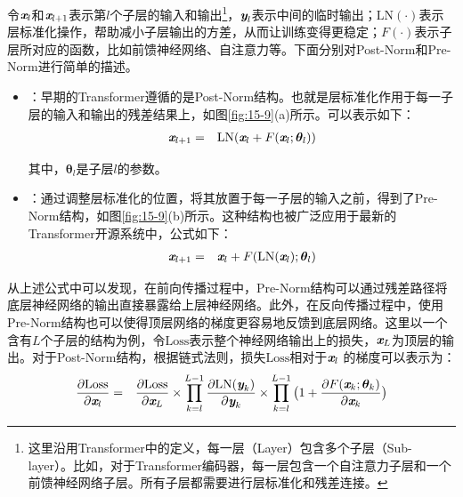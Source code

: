 \parinterval 令$\textbf{\em x}_l$和$\textbf{\em x}_{l+1}$表示第$l$个子层的输入和输出\footnote[4]{这里沿用Transformer中的定义，每一层（Layer）包含多个子层（Sub-layer）。比如，对于Transformer编码器，每一层包含一个自注意力子层和一个前馈神经网络子层。所有子层都需要进行层标准化和残差连接。}，$\textbf{\em y}_l$表示中间的临时输出；$\textrm{LN}(\cdot)$表示层标准化操作，帮助减小子层输出的方差，从而让训练变得更稳定；$F(\cdot)$表示子层所对应的函数，比如前馈神经网络、自注意力等。下面分别对Post-Norm和Pre-Norm进行简单的描述。
\begin{itemize}
\vspace{0.5em}
\item {\small{}}：早期的Transformer遵循的是Post-Norm结构。也就是层标准化作用于每一子层的输入和输出的残差结果上，如图\ref{fig:15-9}(a)所示。可以表示如下：
\begin{eqnarray}
\textbf{\em x}_{l+1} &=& \textrm{LN}(\textbf{\em x}_l+F(\textbf{\em x}_l;{\bm  \theta_l}))
\label{eq:15-26}
\end{eqnarray}

\noindent 其中，$\bm \theta_l$是子层$l$的参数。
\vspace{0.5em}
\item {\small{}}：通过调整层标准化的位置，将其放置于每一子层的输入之前，得到了Pre-Norm结构，如图\ref{fig:15-9}(b)所示。这种结构也被广泛应用于最新的Transformer开源系统中，公式如下：
\begin{eqnarray}
\textbf{\em x}_{l+1} &=& \textbf{\em x}_l+F(\textrm{LN}(\textbf{\em x}_l);{\bm  \theta_l})
\label{eq:15-27}
\end{eqnarray}
\end{itemize}

\parinterval 从上述公式中可以发现，在前向传播过程中，Pre-Norm结构可以通过残差路径将底层神经网络的输出直接暴露给上层神经网络。此外，在反向传播过程中，使用Pre-Norm结构也可以使得顶层网络的梯度更容易地反馈到底层网络。这里以一个含有$L$个子层的结构为例，令$\textrm{Loss}$表示整个神经网络输出上的损失，$\textbf{\em x}_L$为顶层的输出。对于Post-Norm结构，根据链式法则，损失$\textrm{Loss}$相对于$\textbf{\em x}_l$ 的梯度可以表示为：
\begin{eqnarray}
\frac{\partial \textrm{Loss}}{\partial \textbf{\em x}_l} &=& \frac{\partial \textrm{Loss}}{\partial \textbf{\em x}_L} \times \prod_{k=l}^{L-1}\frac{\partial \textrm{LN}(\textbf{\em y}_k)}{\partial \textbf{\em y}_k} \times \prod_{k=l}^{L-1}\big(1+\frac{\partial F(\textbf{\em x}_k;{\bm \theta_k})}{\partial \textbf{\em x}_k} \big)
\label{eq:15-28}
\end{eqnarray}

